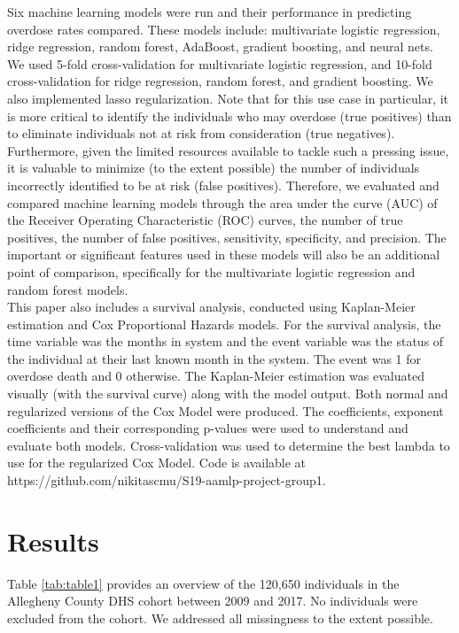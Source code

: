 \documentclass[twoside,10.5pt]{article}
\begin{document}
Six machine learning models were run and their performance in predicting overdose rates compared. These models include: multivariate logistic regression, ridge regression, random forest, AdaBoost, gradient boosting, and neural nets. We used 5-fold cross-validation for multivariate logistic regression, and 10-fold cross-validation for ridge regression, random forest, and gradient boosting. We also implemented lasso regularization. Note that for this use case in particular, it is more critical to identify the individuals who may overdose (true positives) than to eliminate individuals not at risk from consideration (true negatives). Furthermore, given the limited resources available to tackle such a pressing issue, it is valuable to minimize (to the extent possible) the number of individuals incorrectly identified to be at risk (false positives). Therefore, we evaluated and compared machine learning models through the area under the curve (AUC) of the Receiver Operating Characteristic (ROC) curves, the number of true positives, the number of false positives, sensitivity, specificity, and precision. The important or significant features used in these models will also be an additional point of comparison, specifically for the multivariate logistic regression and random forest models.\\

This paper also includes a survival analysis, conducted using Kaplan-Meier estimation and Cox Proportional Hazards models. For the survival analysis, the time variable was the months in system and the event variable was the status of the individual at their last known month in the system. The event was 1 for overdose death and 0 otherwise. The Kaplan-Meier estimation was evaluated visually (with the survival curve) along with the model output. Both normal and regularized versions of the Cox Model were produced. The coefficients, exponent coefficients and their corresponding p-values were used to understand and evaluate both models. Cross-validation was used to determine the best lambda to use for the regularized Cox Model. 
Code is available at https://github.com/nikitascmu/S19-aamlp-project-group1. 

\section{Results}

Table \ref{tab:table1} provides an overview of the 120,650 individuals in the Allegheny County DHS cohort between 2009 and 2017. No individuals were excluded from the cohort. We addressed all missingness to the extent possible.
\end{document}
